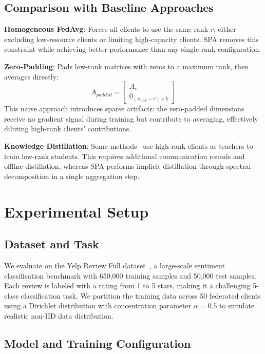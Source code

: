\documentclass[conference]{IEEEtran}
\begin{document}
\subsection{Comparison with Baseline Approaches}

\textbf{Homogeneous FedAvg}: Forces all clients to use the same rank $r$, either excluding low-resource clients or limiting high-capacity clients. SPA removes this constraint while achieving better performance than any single-rank configuration.

\textbf{Zero-Padding}: Pads low-rank matrices with zeros to a maximum rank, then averages directly:
\begin{equation}
A_{padded} = \begin{bmatrix} A_{r} \\ 0_{(r_{max}-r) \times k} \end{bmatrix}
\end{equation}
This naive approach introduces sparse artifacts: the zero-padded dimensions receive no gradient signal during training but contribute to averaging, effectively diluting high-rank clients' contributions.

\textbf{Knowledge Distillation}: Some methods~\cite{zhang2022fedkd} use high-rank clients as teachers to train low-rank students. This requires additional communication rounds and offline distillation, whereas SPA performs implicit distillation through spectral decomposition in a single aggregation step.

\section{Experimental Setup}
\label{sec:experiments}

\subsection{Dataset and Task}

We evaluate on the Yelp Review Full dataset~\cite{zhang2015yelp}, a large-scale sentiment classification benchmark with 650,000 training samples and 50,000 test samples. Each review is labeled with a rating from 1 to 5 stars, making it a challenging 5-class classification task. We partition the training data across 50 federated clients using a Dirichlet distribution with concentration parameter $\alpha = 0.5$ to simulate realistic non-IID data distribution.

\subsection{Model and Training Configuration}
\end{document}
